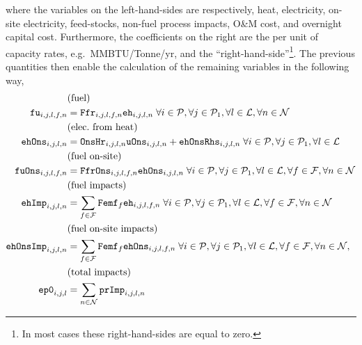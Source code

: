 \documentclass{amsbook}
\begin{document}
%
where the variables on the left-hand-sides are respectively, heat, electricity,
on-site electricity, feed-stocks, non-fuel process impacts, O\&M cost, and
overnight capital cost. Furthermore, the coefficients on the right are the per
unit of capacity rates, e.g.\ MMBTU/Tonne/yr, and the
``right-hand-side''\footnote{In most cases these right-hand-sides are equal to
zero.}.
%
The previous quantities then enable the calculation of the remaining variables
in the following way,
%
\begin{align}\label{eq:eqset2}
    & \text{(fuel)} \notag \\
    \mathtt{fu}_{i,j,l,f,n} &= 
    \mathtt{Ffr}_{i,j,l,f,n} 
    \mathtt{eh}_{i,j,l,n} \;
    \forall i \in \mathcal{P},
    \forall j \in \mathcal{P}_1, 
    \forall l \in \mathcal{L},
    \forall n \in \mathcal{N}\\
    & \text{(elec.\ from heat)} \notag \\
    \mathtt{ehOns}_{i,j,l,n} &= 
    \mathtt{OnsHr}_{i,j,l,n} \mathtt{uOns}_{i,j,l,n} +
    \mathtt{ehOnsRhs}_{i,j,l,n} \;
    \forall i \in \mathcal{P},
    \forall j \in \mathcal{P}_1, 
    \forall l \in \mathcal{L}\\
    & \text{(fuel on-site)} \notag \\
    \mathtt{fuOns}_{i,j,l,f,n} &= 
    \mathtt{FfrOns}_{i,j,l,f,n} \mathtt{ehOns}_{i,j,l,n} \; 
    \forall i \in \mathcal{P},
    \forall j \in \mathcal{P}_1 , 
    \forall l \in \mathcal{L},
    \forall f \in \mathcal{F}, 
    \forall n \in \mathcal{N} \\
    & \text{(fuel impacts)} \notag \\
    \mathtt{ehImp}_{i,j,l,n} &= 
    \sum_{f \in \mathcal{F}} \mathtt{Femf}_{f} \mathtt{eh}_{i,j,l,f,n} \;
    \forall i \in \mathcal{P},
    \forall j \in \mathcal{P}_1 , 
    \forall l \in \mathcal{L},
    \forall f \in \mathcal{F}, 
    \forall n \in \mathcal{N} \\
    & \text{(fuel on-site impacts)} \notag \\
    \mathtt{ehOnsImp}_{i,j,l,n} &= 
    \sum_{f \in \mathcal{F}} \mathtt{Femf}_{f} \mathtt{ehOns}_{i,j,l,f,n} \; 
    \forall i \in \mathcal{P},
    \forall j \in \mathcal{P}_1, 
    \forall l \in \mathcal{L},
    \forall f \in \mathcal{F}, 
    \forall n \in \mathcal{N}, \\
    & \text{(total impacts)} \notag \\
    \mathtt{ep0}_{i,j,l} &= 
    \sum_{n\in \mathcal{N}} \mathtt{prImp}_{i,j,l,n} 

\end{align}
\end{document}
